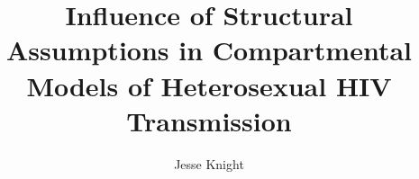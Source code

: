 \author{Jesse Knight}
\title{Influence of Structural Assumptions
  in Compartmental Models of Heterosexual HIV Transmission}
